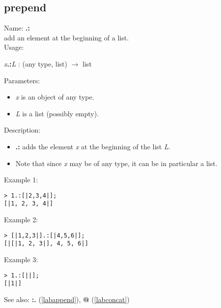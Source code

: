 \subsection{prepend}
\label{labprepend}
\noindent Name: \textbf{.:}\\
add an element at the beginning of a list.\\
\noindent Usage: 
\begin{center}
\emph{x}\textbf{.:}\emph{L} : (\textsf{any type}, \textsf{list}) $\rightarrow$ \textsf{list}
\end{center}
Parameters: 
\begin{itemize}
\item \emph{x} is an object of any type.
\item \emph{L} is a list (possibly empty).
\end{itemize}
\noindent Description: \begin{itemize}

\item \textbf{.:} adds the element \emph{x} at the beginning of the list \emph{L}.

\item Note that since \emph{x} may be of any type, it can be in particular a list.
\end{itemize}
\noindent Example 1: 
\begin{center}\begin{minipage}{15cm}\begin{Verbatim}[frame=single]
> 1.:[|2,3,4|];
[|1, 2, 3, 4|]
\end{Verbatim}
\end{minipage}\end{center}
\noindent Example 2: 
\begin{center}\begin{minipage}{15cm}\begin{Verbatim}[frame=single]
> [|1,2,3|].:[|4,5,6|];
[|[|1, 2, 3|], 4, 5, 6|]
\end{Verbatim}
\end{minipage}\end{center}
\noindent Example 3: 
\begin{center}\begin{minipage}{15cm}\begin{Verbatim}[frame=single]
> 1.:[||];
[|1|]
\end{Verbatim}
\end{minipage}\end{center}
See also: \textbf{:.} (\ref{labappend}), \textbf{@} (\ref{labconcat})
